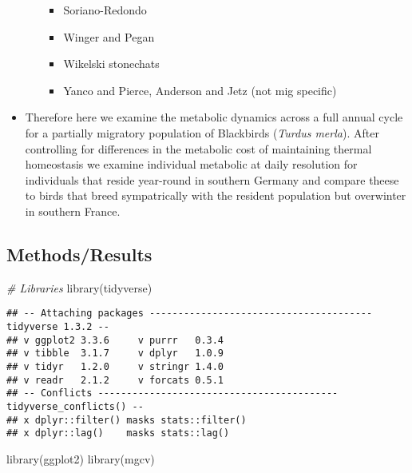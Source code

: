 \documentclass[
]{article}
\newenvironment{Shaded}{\begin{snugshade}}{\end{snugshade}}
\newcommand{\CommentTok}[1]{\textcolor[rgb]{0.56,0.35,0.01}{\textit{#1}}}
\newcommand{\FunctionTok}[1]{\textcolor[rgb]{0.00,0.00,0.00}{#1}}
\newcommand{\NormalTok}[1]{#1}
\providecommand{\tightlist}{%
  \setlength{\itemsep}{0pt}\setlength{\parskip}{0pt}}
\begin{document}
\begin{itemize}
\begin{itemize}
    \begin{itemize}
    \tightlist
    \item
      Soriano-Redondo
    \item
      Winger and Pegan
    \item
      Wikelski stonechats
    \item
      Yanco and Pierce, Anderson and Jetz (not mig specific)
    \end{itemize}
  \end{itemize}
\item
  Therefore here we examine the metabolic dynamics across a full annual
  cycle for a partially migratory population of Blackbirds (\emph{Turdus
  merla}). After controlling for differences in the metabolic cost of
  maintaining thermal homeostasis we examine individual metabolic at
  daily resolution for individuals that reside year-round in southern
  Germany and compare theese to birds that breed sympatrically with the
  resident population but overwinter in southern France.
\end{itemize}

\hypertarget{methodsresults}{%
\subsection{Methods/Results}\label{methodsresults}}

\begin{Shaded}
\begin{Highlighting}[]
\CommentTok{\# Libraries}
\FunctionTok{library}\NormalTok{(tidyverse)}
\end{Highlighting}
\end{Shaded}

\begin{verbatim}
## -- Attaching packages --------------------------------------- tidyverse 1.3.2 --
## v ggplot2 3.3.6     v purrr   0.3.4
## v tibble  3.1.7     v dplyr   1.0.9
## v tidyr   1.2.0     v stringr 1.4.0
## v readr   2.1.2     v forcats 0.5.1
## -- Conflicts ------------------------------------------ tidyverse_conflicts() --
## x dplyr::filter() masks stats::filter()
## x dplyr::lag()    masks stats::lag()
\end{verbatim}

\begin{Shaded}
\begin{Highlighting}[]
\FunctionTok{library}\NormalTok{(ggplot2)}
\FunctionTok{library}\NormalTok{(mgcv)}
\end{Highlighting}
\end{Shaded}
\end{document}
